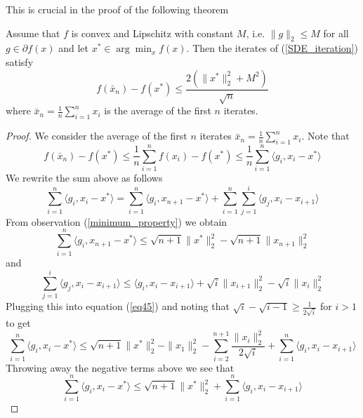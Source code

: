 This is crucial in the proof of the following theorem
\begin{theorem}
 Assume that $f$ is convex and Lipschitz with constant $M$, i.e. $\|g\|_2 \leq M$ for all $g\in \partial f(x)$ and let
 $x^*\in \arg\min_x f(x)$. Then the
 iterates of (\ref{SDE_iteration}) satisfy
 \begin{equation}
     f(\bar{x}_n) - f(x^*) \leq \frac{2(\|x^*\|_2^2 + M^2)}{\sqrt{n}}
 \end{equation}
 where $\bar{x}_n = \frac{1}{n}\sum_{i = 1}^nx_i$ is the average of the first $n$ iterates.
\end{theorem}
\begin{proof}
We consider the average of the first $n$ iterates $\bar{x}_n = \frac{1}{n}\sum_{i = 1}^nx_i$. Note that
\begin{equation}
    f(\bar{x}_n) - f(x^*) \leq \frac{1}{n}\displaystyle\sum_{i = 1}^n f(x_i) - f(x^*) \leq \frac{1}{n}\displaystyle\sum_{i = 1}^n \langle g_i, x_i - x^*\rangle
\end{equation}
We rewrite the sum above as follows
\begin{equation}\label{eq45}
    \displaystyle\sum_{i = 1}^n \langle g_i, x_i - x^*\rangle = \displaystyle\sum_{i = 1}^n \langle g_i, x_{n+1} - x^*\rangle + \displaystyle\sum_{i = 1}^n \displaystyle\sum_{j = 1}^i\langle g_j, x_i - x_{i+1}\rangle
\end{equation}
From observation (\ref{minimum_property}) we obtain
\begin{equation}
    \displaystyle\sum_{i = 1}^n \langle g_i, x_{n+1} - x^*\rangle \leq \sqrt{n+1}\|x^*\|_2^2 - \sqrt{n+1}\|x_{n+1}\|_2^2
\end{equation}
and
\begin{equation}
    \displaystyle\sum_{j = 1}^i\langle g_j, x_i - x_{i+1}\rangle \leq \langle g_i, x_i - x_{i+1}\rangle + \sqrt{i}\|x_{i+1}\|_2^2 - \sqrt{i}\|x_{i}\|_2^2
\end{equation}
Plugging this into equation (\ref{eq45}) and noting that $\sqrt{i} - \sqrt{i - 1} \geq \frac{1}{2\sqrt{i}}$ for $i > 1$ to get
\begin{equation}
    \displaystyle\sum_{i = 1}^n \langle g_i, x_i - x^*\rangle \leq \sqrt{n+1}\|x^*\|_2^2 - \|x_1\|_2^2 - \displaystyle\sum_{i = 2}^{n+1}\frac{\|x_i\|_2^2}{2\sqrt{i}} + \displaystyle\sum_{i=1}^n\langle g_i, x_i - x_{i+1}\rangle
\end{equation}
Throwing away the negative terms above we see that
\begin{equation}\label{eq61}
    \displaystyle\sum_{i = 1}^n \langle g_i, x_i - x^*\rangle \leq \sqrt{n+1}\|x^*\|_2^2 + \displaystyle\sum_{i=1}^n\langle g_i, x_i - x_{i+1}\rangle

\end{equation}
\end{proof}
